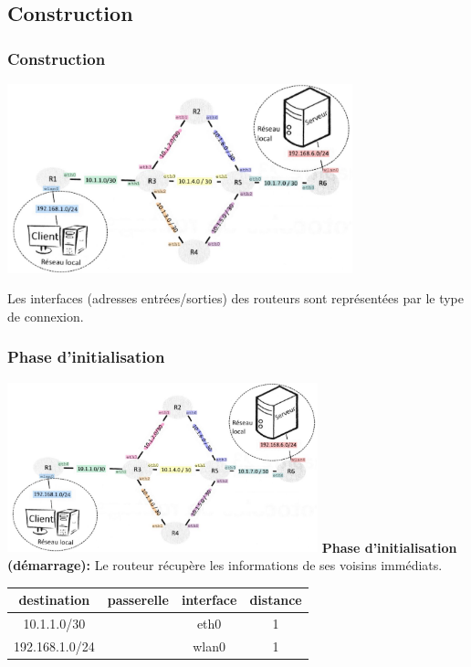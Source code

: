 \documentclass[svgnames,11pt]{beamer}
\begin{document}
\subsection{Construction}
\begin{frame}
    \frametitle{Construction}
    \includegraphics[width=10cm]{ressources/reseau.png}
\begin{aretenir}[Remarque]
Les interfaces (adresses entrées/sorties) des routeurs sont représentées par le type de connexion.
\end{aretenir}
\end{frame}

\begin{frame}
    \frametitle{Phase d'initialisation}
        \includegraphics[width=9cm]{ressources/reseau.png}
\textbf{Phase d'initialisation (démarrage):} Le routeur récupère les informations de ses voisins immédiats.

        \begin{center}
    \begin{tabular}{|*{4}{c|}}
        \hline
        destination    & passerelle & interface & distance \\
        \hline
        10.1.1.0/30    &            & eth0      & 1        \\
        \hline
        192.168.1.0/24 &            & wlan0     & 1        \\
        \hline
    \end{tabular}
\end{center}
\end{frame}
\end{document}
